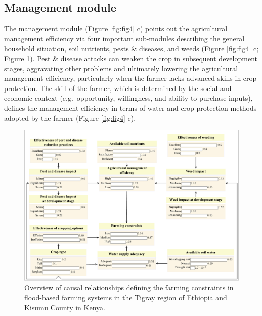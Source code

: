 \documentclass[]{elsarticle} %
\begin{document}
\hypertarget{ref45}{%
\subsection{Management module}\label{ref45}}

The management module (Figure \ref{fig:fig4} c) points out the agricultural management efficiency via four important sub-modules describing the general household situation, soil nutrients, pests \& diseases, and weeds (Figure \ref{fig:fig4} c; Figure \ref{fig:fig9}). Pest \& disease attacks can weaken the crop in subsequent development stages, aggravating other problems and ultimately lowering the agricultural management efficiency, particularly when the farmer lacks advanced skills in crop protection. The skill of the farmer, which is determined by the social and economic context (e.g.~opportunity, willingness, and ability to purchase inputs), defines the management efficiency in terms of water and crop protection methods adopted by the farmer (Figure \ref{fig:fig4} c).

\begin{figure}[!h]

{\centering \includegraphics[width=1\linewidth,]{figures/farming-constraints-1} 

}

\caption{Overview of causal relationships defining the farming constraints in flood-based farming systems in the Tigray region of Ethiopia and Kisumu County in Kenya.}\label{fig:fig9}
\end{figure}
\end{document}
